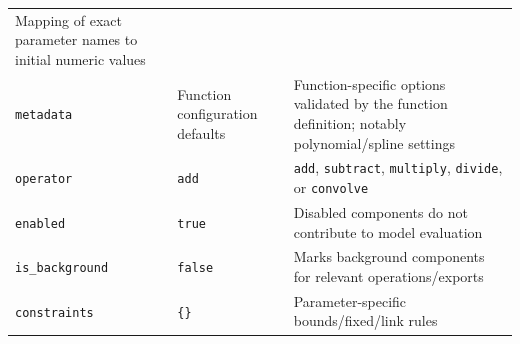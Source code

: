 \documentclass[
  10pt,
  a4paper,
  oneside]{scrreprt}
\begin{document}
\begin{longtable}[]{@{}lll@{}}
\begin{minipage}[t]{0.30\columnwidth}
Mapping of exact parameter names to initial numeric values\strut
\end{minipage}\tabularnewline
\begin{minipage}[t]{0.30\columnwidth}\raggedright
\texttt{metadata}\strut
\end{minipage} & \begin{minipage}[t]{0.30\columnwidth}\raggedright
Function configuration defaults\strut
\end{minipage} & \begin{minipage}[t]{0.30\columnwidth}\raggedright
Function-specific options validated by the function definition; notably
polynomial/spline settings\strut
\end{minipage}\tabularnewline
\begin{minipage}[t]{0.30\columnwidth}\raggedright
\texttt{operator}\strut
\end{minipage} & \begin{minipage}[t]{0.30\columnwidth}\raggedright
\texttt{add}\strut
\end{minipage} & \begin{minipage}[t]{0.30\columnwidth}\raggedright
\texttt{add}, \texttt{subtract}, \texttt{multiply}, \texttt{divide}, or
\texttt{convolve}\strut
\end{minipage}\tabularnewline
\begin{minipage}[t]{0.30\columnwidth}\raggedright
\texttt{enabled}\strut
\end{minipage} & \begin{minipage}[t]{0.30\columnwidth}\raggedright
\texttt{true}\strut
\end{minipage} & \begin{minipage}[t]{0.30\columnwidth}\raggedright
Disabled components do not contribute to model evaluation\strut
\end{minipage}\tabularnewline
\begin{minipage}[t]{0.30\columnwidth}\raggedright
\texttt{is\_background}\strut
\end{minipage} & \begin{minipage}[t]{0.30\columnwidth}\raggedright
\texttt{false}\strut
\end{minipage} & \begin{minipage}[t]{0.30\columnwidth}\raggedright
Marks background components for relevant operations/exports\strut
\end{minipage}\tabularnewline
\begin{minipage}[t]{0.30\columnwidth}\raggedright
\texttt{constraints}\strut
\end{minipage} & \begin{minipage}[t]{0.30\columnwidth}\raggedright
\texttt{\{\}}\strut
\end{minipage} & \begin{minipage}[t]{0.30\columnwidth}\raggedright
Parameter-specific bounds/fixed/link rules\strut
\end{minipage}\tabularnewline
\bottomrule
\end{longtable}
\end{document}
